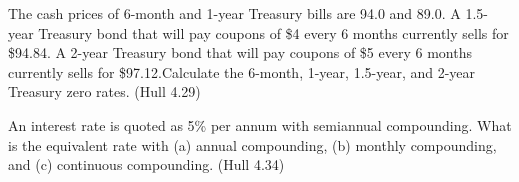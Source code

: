 \documentclass[12pt,letterpaper, onecolumn]{exam}
\begin{document}
\begin{questions}
    \begin{solution}
            
    \end{solution}

    \question The cash prices of 6-month and 1-year Treasury bills are 94.0 and 89.0. A 1.5-year Treasury bond that will pay coupons of \$4 every 6 months currently sells for \$94.84. A 2-year Treasury bond that will pay coupons of \$5 every 6 months currently sells for \$97.12.Calculate the 6-month, 1-year, 1.5-year, and 2-year Treasury zero rates. (Hull 4.29)

    \begin{solution}
            
    \end{solution}

    \question An interest rate is quoted as 5\% per annum with semiannual compounding. What is the equivalent rate with (a) annual compounding, (b) monthly compounding, and (c) continuous compounding. (Hull 4.34)

    \begin{solution}
            
    \end{solution}

    
\end{questions}
\end{document}
